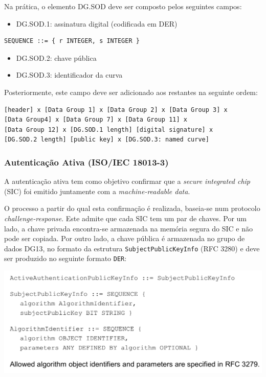 Na prática, o elemento DG.SOD deve ser composto pelos seguintes campos:

\begin{itemize}
\item DG.SOD.1: assinatura digital (codificada em DER)
\end{itemize}
\begin{Verbatim}
SEQUENCE ::= { r INTEGER, s INTEGER }
\end{Verbatim}
\begin{itemize}
\item DG.SOD.2: chave pública
\item DG.SOD.3: identificador da curva
\end{itemize}

Posteriormente, este campo deve ser adicionado aos restantes na seguinte
ordem: 

\begin{Verbatim}
[header] x [Data Group 1] x [Data Group 2] x [Data Group 3] x 
[Data Group4] x [Data Group 7] x [Data Group 11] x 
[Data Group 12] x [DG.SOD.1 length] [digital signature] x 
[DG.SOD.2 length] [public key] x [DG.SOD.3: named curve]
\end{Verbatim}


\subsubsection{Autenticação Ativa (ISO/IEC 18013-3)}
\label{sec:org940f982}
A autenticação ativa tem como objetivo confirmar que a \emph{secure integrated
chip} (SIC) foi emitido juntamente com a \emph{machine-readable data}.

O processo a partir do qual esta confirmação é realizada, baseia-se num
protocolo \emph{challenge-response}. Este admite que cada SIC tem um par de chaves.
Por um lado, a chave privada encontra-se armazenada na memória segura do SIC
e não pode ser copiada. Por outro lado, a chave pública é armazenada no
grupo de dados DG13, no formato da estrutura \texttt{SubjectPublicKeyInfo} (RFC 3280)
e deve ser produzido no seguinte formato \texttt{DER}:

\begin{center}
\includegraphics[width=.9\linewidth]{./images/subjectPublicKeyInfo_der.jpeg}
\end{center}

